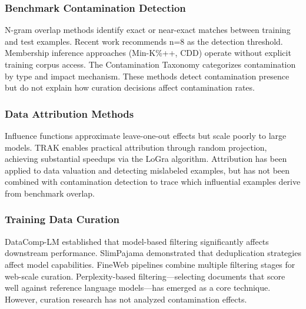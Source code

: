 
\subsubsection{Benchmark Contamination Detection}

N-gram overlap methods identify exact or near-exact matches between training and test examples. Recent work recommends n=8 as the detection threshold. Membership inference approaches (Min-K\%++, CDD) operate without explicit training corpus access. The Contamination Taxonomy categorizes contamination by type and impact mechanism. These methods detect contamination presence but do not explain how curation decisions affect contamination rates.

\subsubsection{Data Attribution Methods}

Influence functions approximate leave-one-out effects but scale poorly to large models. TRAK enables practical attribution through random projection, achieving substantial speedups via the LoGra algorithm. Attribution has been applied to data valuation and detecting mislabeled examples, but has not been combined with contamination detection to trace which influential examples derive from benchmark overlap.

\subsubsection{Training Data Curation}

DataComp-LM established that model-based filtering significantly affects downstream performance. SlimPajama demonstrated that deduplication strategies affect model capabilities. FineWeb pipelines combine multiple filtering stages for web-scale curation. Perplexity-based filtering---selecting documents that score well against reference language models---has emerged as a core technique. However, curation research has not analyzed contamination effects.
